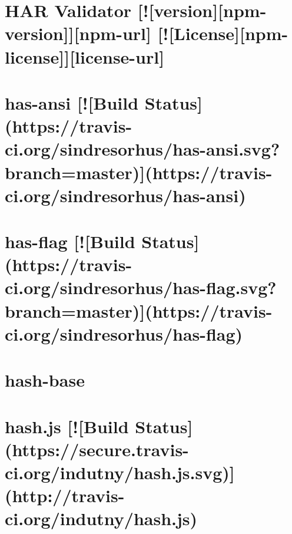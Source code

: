 \documentclass[twoside]{book}
\newcommand{\+}{\discretionary{\mbox{\scriptsize$\hookleftarrow$}}{}{}}
\begin{document}
\chapter{H\+AR Validator \mbox{[}!\mbox{[}version\mbox{]}\mbox{[}npm-\/version\mbox{]}\mbox{]}\mbox{[}npm-\/url\mbox{]} \mbox{[}!\mbox{[}License\mbox{]}\mbox{[}npm-\/license\mbox{]}\mbox{]}\mbox{[}license-\/url\mbox{]}}
\label{md__c_1_workspace_demo_src_main_script_node_modules_har-validator__r_e_a_d_m_e}

\chapter{has-\/ansi \mbox{[}!\mbox{[}Build Status\mbox{]}(https\+://travis-\/ci.org/sindresorhus/has-\/ansi.svg?branch=master)\mbox{]}(https\+://travis-\/ci.org/sindresorhus/has-\/ansi)}
\label{md__c_1_workspace_demo_src_main_script_node_modules_has-ansi_readme}

\chapter{has-\/flag \mbox{[}!\mbox{[}Build Status\mbox{]}(https\+://travis-\/ci.org/sindresorhus/has-\/flag.svg?branch=master)\mbox{]}(https\+://travis-\/ci.org/sindresorhus/has-\/flag)}
\label{md__c_1_workspace_demo_src_main_script_node_modules_has-flag_readme}

\chapter{hash-\/base}
\label{md__c_1_workspace_demo_src_main_script_node_modules_hash-base__r_e_a_d_m_e}

\chapter{hash.\+js \mbox{[}!\mbox{[}Build Status\mbox{]}(https\+://secure.travis-\/ci.org/indutny/hash.js.\+svg)\mbox{]}(http\+://travis-\/ci.org/indutny/hash.js)}
\label{md__c_1_workspace_demo_src_main_script_node_modules_hash_8js__r_e_a_d_m_e}

\end{document}
